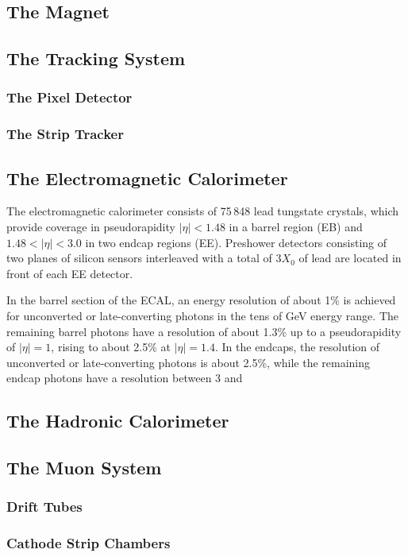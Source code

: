 \subsection{The Magnet}

\subsection{The Tracking System}
\subsubsection{The Pixel Detector}
\subsubsection{The Strip Tracker}
\subsection{The Electromagnetic Calorimeter}
The electromagnetic calorimeter consists of 75\,848 lead tungstate
crystals, which provide coverage in pseudorapidity $|\eta| < 1.48
$ in a barrel region (EB) and $1.48 < |\eta| < 3.0$ in two endcap
regions (EE). Preshower detectors consisting of two planes of silicon
sensors interleaved with a total of $3 X_0$ of lead are located in
front of each EE detector.

In the barrel section of the ECAL, an energy resolution of about 1\%
is achieved for unconverted or late-converting photons in the tens of
GeV energy range. The remaining barrel photons have a resolution of
about 1.3\% up to a pseudorapidity of $|\eta| = 1$, rising to
about 2.5\% at $|\eta| = 1.4$. In the endcaps, the resolution of
unconverted or late-converting photons is about 2.5\%, while the
remaining endcap photons have a resolution between 3 and


\subsection{The Hadronic Calorimeter}
\subsection{The Muon System}
\subsubsection{Drift Tubes}
\subsubsection{Cathode Strip Chambers}
